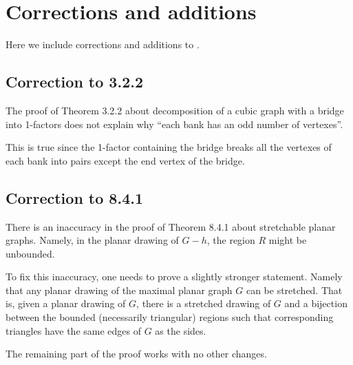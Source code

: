 \chapter{Corrections and additions}

Here we include corrections and additions to \cite{hartsfield-ringel}.

\section*{Correction to 3.2.2}

The proof of Theorem 3.2.2 about decomposition of a cubic graph with a bridge into 1-factors
does not explain why ``each bank has an odd number of vertexes''.

This is true since the 1-factor containing the bridge breaks all the vertexes of each bank into pairs except the end vertex of the bridge.


\section*{Correction to 8.4.1}

There is an inaccuracy in the proof of Theorem 8.4.1 about stretchable planar graphs.
Namely, in the planar drawing of $G-h$, the region $R$ might be unbounded.

To fix this inaccuracy, one needs to prove a slightly stronger statement.
Namely that any planar drawing of the maximal planar graph $G$ can be stretched.
That is, given a planar drawing of $G$, there is a stretched drawing of $G$ 
and a bijection between the bounded (necessarily triangular) regions such that corresponding triangles have the same edges of $G$ as the sides.

The remaining part of the proof works with no other changes.

